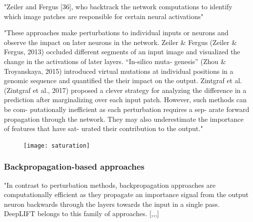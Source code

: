 		"Zeiler and Fergus [36], who backtrack the network computations to identify which image patches are responsible for certain neural activations" \cite{Mahendran2015}
		
		"These approaches make perturbations to individual inputs or neurons and observe the impact on later neurons in the network. Zeiler \& Fergus (Zeiler \& Fergus, 2013) occluded different segments of an input image and visualized the change in the activations of later layers. “In-silico muta- genesis” (Zhou \& Troyanskaya, 2015) introduced virtual mutations at individual positions in a genomic sequence and quantified the their impact on the output. Zintgraf et al. (Zintgraf et al., 2017) proposed a clever strategy for analyzing the difference in a prediction after marginalizing over each input patch. However, such methods can be com- putationally inefficient as each perturbation requires a sep- arate forward propagation through the network. They may also underestimate the importance of features that have sat- urated their contribution to the output." \cite{Shrikumar2017}
		\begin{figure}[h]
			\centering
			\texttt{[image: saturation]}
		\end{figure}

		\subsubsection{Backpropagation-based approaches}
		"In contrast to perturbation methods, backpropagation approaches are computationally efficient as they propagate an importance signal from the output neuron backwards through the layers towards the input in a single pass.
		DeepLIFT belongs to this family of approaches.
		[,,,]
		
